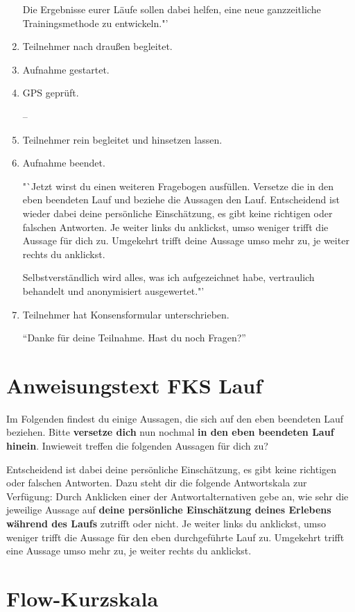 \begin{enumerate}
Die Ergebnisse eurer Läufe sollen dabei helfen, eine neue ganzzeitliche Trainingsmethode zu entwickeln."'

\item Teilnehmer nach draußen begleitet. 
\item Aufnahme gestartet.
\item GPS geprüft.

--

\item Teilnehmer rein begleitet und hinsetzen lassen.
\item Aufnahme beendet.

"`Jetzt wirst du einen weiteren Fragebogen ausfüllen. Versetze die in den eben beendeten Lauf und beziehe die Aussagen den Lauf. Entscheidend ist wieder dabei deine persönliche Einschätzung, es gibt keine richtigen oder falschen Antworten. Je weiter links du anklickst, umso weniger trifft die Aussage für dich zu. Umgekehrt trifft deine Aussage umso mehr zu, je weiter rechts du anklickst.

Selbstverständlich wird alles, was ich aufgezeichnet habe, vertraulich behandelt und anonymisiert ausgewertet."'

\item Teilnehmer hat Konsensformular unterschrieben. 

"`Danke für deine Teilnahme. Hast du noch Fragen?"'
\end{enumerate}
\pagebreak

\section{Anweisungstext FKS Lauf}
Im Folgenden findest du einige Aussagen, die sich auf den eben beendeten Lauf beziehen. Bitte \textbf{versetze dich} nun nochmal \textbf{in den eben beendeten Lauf hinein}. Inwieweit treffen die folgenden Aussagen für dich zu?

Entscheidend ist dabei deine persönliche Einschätzung, es gibt keine richtigen oder falschen Antworten. Dazu steht dir die folgende Antwortskala zur Verfügung: 
Durch Anklicken einer der Antwortalternativen gebe an, wie sehr die jeweilige Aussage auf \textbf{deine persönliche Einschätzung deines Erlebens während des Laufs} zutrifft oder nicht. Je weiter links du anklickst, umso weniger trifft die Aussage für den eben durchgeführte Lauf zu. Umgekehrt trifft eine Aussage umso mehr zu, je weiter rechts du anklickst.
\pagebreak
\section{Flow-Kurzskala} %
\label{sec:flow_kurzskala}

